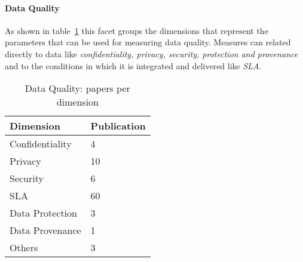 \paragraph{Data Quality} 
As shown in table~\ref{table:dq} this facet groups the dimensions that represent the parameters that can be used for measuring data quality. Measures can related directly to data like {\em confidentiality, privacy, security, protection and provenance} and to the conditions in which it is integrated and delivered like {\em SLA}.

\begin{table}[!h]
\begin{center}
\begin{tabular}{p{4cm}p{4cm}}
\hline 
\textbf{Dimension} & \textbf{Publication} \\ 
\hline 
Confidentiality & 4 \\ 
\hline 
Privacy & 10 \\ 
\hline 
Security & 6 \\ 
\hline 
SLA  & 60\\
\hline 
Data Protection & 3 \\ 
\hline 
Data Provenance & 1 \\ 
\hline 
Others & 3 \\ 
\hline 
\end{tabular}
\end{center}
\caption{Data Quality: papers per dimension}\label{table:dq}
\end{table}

